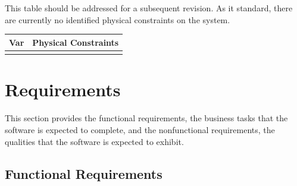 \documentclass[12pt]{article}
\begin{document}
\noindent
\\
\\
This table should be addressed for a subsequent revision. As it standard, there are currently no 
identified physical constraints on the system.
\begin{table}[!h]
\caption{Output Variables} \label{TblOutputVar}
\renewcommand{\arraystretch}{1.2}
\noindent \begin{longtable*}{l l} 
  \toprule
  \textbf{Var} & \textbf{Physical Constraints} \\
  \midrule 

  \\
  \bottomrule
\end{longtable*}
\end{table}

\section{Requirements}\label{Header_Req}
This section provides the functional requirements, the business tasks that the
software is expected to complete, and the nonfunctional requirements, the
qualities that the software is expected to exhibit.

\newpage
\subsection{Functional Requirements}
\end{document}
